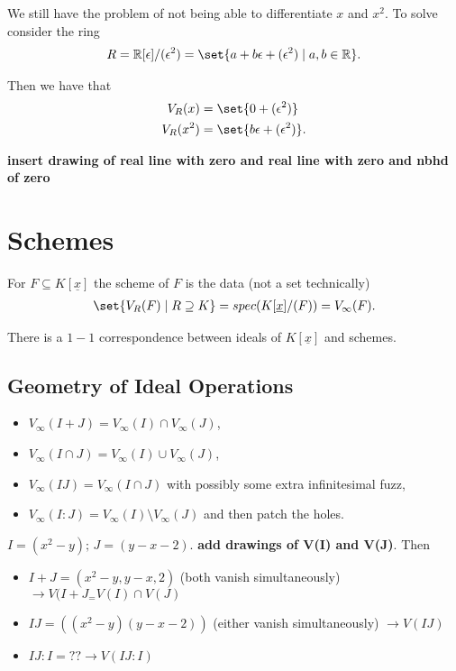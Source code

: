 We still have the problem of not being able to differentiate $x$ and $x^2$. To solve consider the ring
\begin{align*}
    R = \R[\epsilon] / (\epsilon^2) = \set{a + b \epsilon + (\epsilon^2) \mid a,b \in \R }.
\end{align*}

Then we have that
\begin{align*}
    V_R(x) &= \set{0 + (\epsilon^2) }\\
    V_R(x^2) &= \set{b \epsilon + (\epsilon^2)}.
\end{align*}

\textbf{insert drawing of real line with zero and real line with zero and nbhd of zero}

\section{Schemes}

\begin{definition}
For $F \subseteq K [ \underline{x}] $ the scheme of $F$ is the data (not a set technically)
\begin{align*}
    \set{V_R(F) \mid R \supseteq K} = spec  ( K [ \underline{x}]/(F) ) = V_\infty (F).
\end{align*}
\end{definition}

\begin{theorem}
There is a $1-1$ correspondence between ideals of $K[ \underline{x} ] $ and schemes.
\end{theorem}

\subsection{Geometry of Ideal Operations}

\begin{itemize}
    \item $V_\infty ( I + J) = V_\infty (I) \cap V_\infty(J)$,
    \item $V_\infty ( I \cap J ) = V_\infty(I) \cup V_\infty(J)$,
    \item $V_\infty ( IJ) = V_\infty ( I \cap J) $ with possibly some extra infinitesimal fuzz,
    \item $V_\infty (I:J) = V_\infty ( I ) \setminus V_\infty(J)$ and then patch the holes.
\end{itemize}

\begin{example}
    $I = (x^2 - y) ; \, J = (y-x-2)$.
    \textbf{add drawings of V(I) and V(J)}.
    Then
    \begin{itemize}
        \item $I+J = (x^2 - y, y-x, 2)$ (both vanish simultaneously) $\to V(I+J_ = V(I) \cap V(J)$
        \item $IJ = ( ( x^2 - y) ( y-x-2) )$ (either vanish simultaneously)  $\to V(IJ)$
        \item $IJ : I = ?? \to V(IJ : I)$
    \end{itemize}
\end{example}

